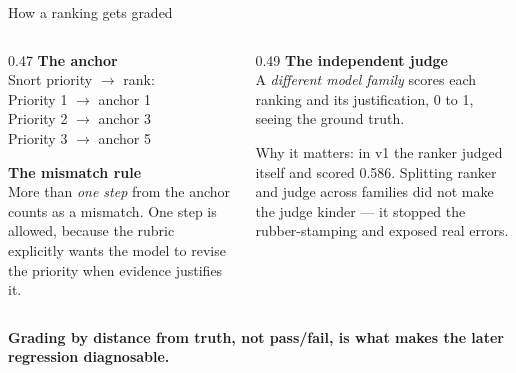 \documentclass[aspectratio=169,11pt]{beamer}
\newcommand{\keytake}[1]{%
  \vfill
  \noindent\colorbox{accenttint}{%
    \begin{minipage}{\dimexpr\textwidth-2\fboxsep-2\fboxrule\relax}
      \vspace{2pt}
      \small\color{accent}\textbf{#1}
      \vspace{2pt}
    \end{minipage}}\par}
\begin{document}
\begin{frame}{How a ranking gets graded}
  \begin{columns}[T,onlytextwidth]
    \begin{column}{0.47\textwidth}
      \textbf{\color{accent}The anchor}\\[0.3em]
      {\small Snort priority $\rightarrow$ rank:\\[0.3em]
      \quad Priority 1 $\rightarrow$ anchor 1\\
      \quad Priority 2 $\rightarrow$ anchor 3\\
      \quad Priority 3 $\rightarrow$ anchor 5}
      \vspace{0.9em}

      \textbf{\color{accent}The mismatch rule}\\[0.3em]
      {\small More than \emph{one step} from the anchor counts as a mismatch. One step is
      allowed, because the rubric explicitly wants the model to revise the priority when
      evidence justifies it.}
    \end{column}
    \begin{column}{0.49\textwidth}
      \textbf{\color{accent}The independent judge}\\[0.3em]
      {\small A \emph{different model family} scores each ranking and its justification,
      0 to 1, seeing the ground truth.}
      \vspace{0.9em}

      {\small Why it matters: in v1 the ranker judged itself and scored 0.586. Splitting
      ranker and judge across families did not make the judge kinder --- it stopped the
      rubber-stamping and exposed real errors.}
    \end{column}
  \end{columns}
  \keytake{Grading by distance from truth, not pass/fail, is what makes the later regression diagnosable.}
\end{frame}
\end{document}
